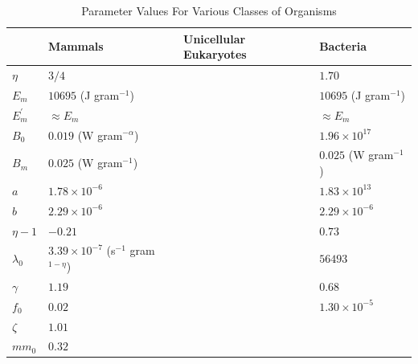\documentclass[12pt,english]{article}
\begin{document}
\begin{spacing}{1.9}
%
\clearpage

\begin{table}[h]
\caption{Parameter Values For Various Classes of Organisms}
\label{parameter-values}
    \begin{center}
    \small
     \begin{tabular}{| p{1.2cm}| p{3.2cm} | p{2.6cm} | p{3.2cm} | }
     \hline
     & {\bf Mammals} & {\bf Unicellular Eukaryotes} & {\bf Bacteria} \\
     \hline
   $\eta$ & $3/4$ & & $1.70$ \\ 
   $E_{m}$ & $10695$ (J gram$^{-1}$) & & $10695$ (J gram$^{-1}$) \\ 
   $E_{m}^{\prime}$ & $\approx E_{m}$ & & $\approx E_{m}$ \\ 
   $B_{0}$ & $0.019$ (W gram$^{-\alpha}$) & & $1.96\times10^{17}$ \\
   $B_{m}$ & $0.025$ (W gram$^{-1}$)   & & $0.025$ (W gram$^{-1}$)\\
   $a$ & $1.78\times10^{-6}$ & & $1.83\times10^{13}$ \\ 
   $b$ & $2.29\times10^{-6}$ & & $2.29\times10^{-6}$ \\  
   $\eta-1$ & $-0.21$ & & $0.73$ \\ 
   $\lambda_{0}$ & $3.39\times10^{-7}$ (s$^{-1}$ gram$^{1-\eta}$) & & $56493$ \\ 
   $\gamma$ & $1.19$ & & $0.68$ \\ 
   $f_{0}$ & $0.02$ & & $1.30\times10^{-5}$ \\ 
   $\zeta$ & $1.01$ & & \\ 
   $mm_{0}$ & $0.32$ & & \\ 
   
      
   \hline
    \end{tabular}
    \end{center}
   \end{table}

\clearpage



\end{spacing}
\end{document}
